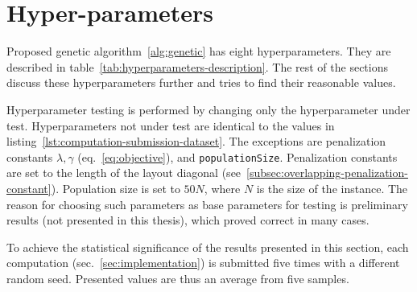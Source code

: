 \newpage


\section{Hyper-parameters}\label{sec:hyper-parameters}

Proposed genetic algorithm~\ref{alg:genetic} has eight hyperparameters.
They are described in table~\ref{tab:hyperparameters-description}.
The rest of the sections discuss these hyperparameters further and tries to find their reasonable values.

Hyperparameter testing is performed by changing only the hyperparameter under test.
Hyperparameters not under test are identical to the values in listing~\ref{lst:computation-submission-dataset}.
The exceptions are penalization constants $\lambda, \gamma$ (eq.~\ref{eq:objective}), and \verb|populationSize|.
Penalization constants are set to the length of the layout diagonal (see~\ref{subsec:overlapping-penalization-constant}).
Population size is set to $50N$, where $N$ is the size of the instance.
The reason for choosing such parameters as base parameters for testing
is preliminary results (not presented in this thesis), which proved correct in many cases.

To achieve the statistical significance of the results presented in this section, each computation (sec.~\ref{sec:implementation}) is submitted five times with a different random seed.
Presented values are thus an average from five samples.

